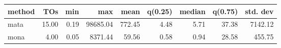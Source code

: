 \begin{tabular}{lrrrrrrrr}
\hline
 method   &   TOs &   min &      max &   mean &   q(0.25) &   median &   q(0.75) &   std. dev \\
\hline
 mata     & 15.00 &  0.19 & 98685.04 & 772.45 &      4.48 &     5.71 &     37.38 &    7142.12 \\
 mona     &  4.00 &  0.05 &  8371.44 &  59.56 &      0.58 &     0.94 &     28.58 &     455.75 \\
\hline
\end{tabular}
